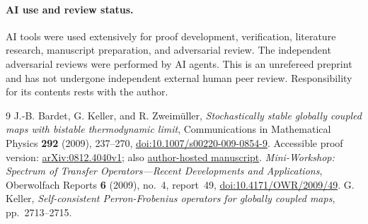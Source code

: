 \documentclass[11pt]{article}
\begin{document}
\paragraph{AI use and review status.}
AI tools were used extensively for proof development, verification,
literature research, manuscript preparation, and adversarial review.
The independent adversarial reviews were performed by AI agents.
This is an unrefereed preprint and has not undergone independent external
human peer review. Responsibility for its contents rests with the author.

\begin{thebibliography}{9}
J.-B. Bardet, G. Keller, and R. Zweim\"uller,
\emph{Stochastically stable globally coupled maps with bistable thermodynamic
limit}, Communications in Mathematical Physics \textbf{292} (2009),
237--270, \href{https://doi.org/10.1007/s00220-009-0854-9}{doi:10.1007/s00220-009-0854-9}.
Accessible proof version: \href{https://arxiv.org/abs/0812.4040v1}{arXiv:0812.4040v1};
also \href{https://mat.univie.ac.at/~zweimueller/MyPub/bkz.pdf}{author-hosted manuscript}.
\emph{Mini-Workshop: Spectrum of Transfer Operators---Recent Developments and Applications},
Oberwolfach Reports \textbf{6} (2009), no.~4, report~49,
\href{https://doi.org/10.4171/OWR/2009/49}{doi:10.4171/OWR/2009/49}.
G. Keller, \emph{Self-consistent Perron-Frobenius operators for globally coupled maps},
pp.~2713--2715.
\end{thebibliography}
\end{document}
